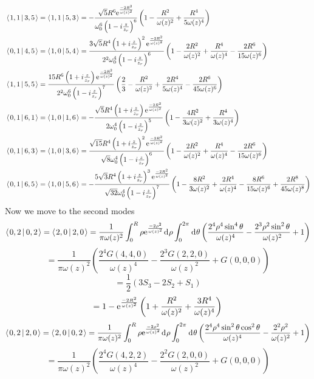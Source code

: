 \documentclass[11pt]{amsart}
\makeatletter
\newcommand{\e}{{\rm e}}				%
\newcommand{\msp}[1]{\mspace{#1mu}}		%
\newcommand{\0}{\varnothing}		%
\newcommand{\dd}{\msp{1} {\rm{d}} \msp{1}}	%
\newcommand{\brac}[2]{\left\langle\msp{2} #1\left\lvert \msp{3.5} #2 \right.\right\rangle}	%
\newcommand{\1}{!}
\newcommand{\2}{@}
\newcommand{\3}{\#}
\newcommand{\4}{\$}
\newcommand{\5}{\%}
\newcommand{\6}{$^\wedge$}
\newcommand{\7}{\&}
\newcommand{\8}{*}
\newcommand{\9}{(}
\makeatother
\begin{document}
\begin{align*}
&
\brac{1,1}{3,5} = \brac{1,1}{5,3} = -\frac{\sqrt{5}R^6\e^{\frac{-2R^2}{\omega(z)^2}}}{\omega_0^6\left(1-i\frac{z}{z_r}\right)^6}\left(1-\frac{R^2}{\omega(z)^2}+\frac{R^4}{5\omega(z)^4}\right)
\\
&
\brac{0,1}{4,5} = \brac{1,0}{5,4} = \frac{3\sqrt{5}R^4\left(1+i\frac{z}{z_r}\right)^2\e^{\frac{-2R^2}{\omega(z)^2}}}{2^2\omega_0^4\left(1-i\frac{z}{z_r}\right)^6}\left(1-\frac{2R^2}{\omega(z)^2}+\frac{R^4}{\omega(z)^4}-\frac{2R^6}{15\omega(z)^6}\right)
\\
&
\brac{1,1}{5,5} = \frac{15R^6\left(1+i\frac{z}{z_r}\right)\e^{\frac{-2R^2}{\omega(z)^2}}}{2^2\omega_0^6\left(1-i\frac{z}{z_r}\right)^7}\left(\frac{2}{3}-\frac{R^2}{\omega(z)^2}+\frac{2R^4}{5\omega(z)^4}-\frac{2R^6}{45\omega(z)^6}\right)
\\
&
\brac{0,1}{6,1} =\brac{1,0}{1,6} = -\frac{\sqrt{5}R^4\left(1+i\frac{z}{z_r}\right)\e^{\frac{-2R^2}{\omega(z)^2}}}{2\omega_0^4\left(1-i\frac{z}{z_r}\right)^5}\left(1-\frac{4R^2}{3\omega(z)^2}+\frac{R^4}{3\omega(z)^4}\right)
\\
&
\brac{0,1}{6,3} = \brac{1,0}{3,6} = \frac{\sqrt{15}R^4\left(1+i\frac{z}{z_r}\right)^2\e^{\frac{-2R^2}{\omega(z)^2}}}{\sqrt{8}\omega_0^4\left(1-i\frac{z}{z_r}\right)^6}\left(1-\frac{2R^2}{\omega(z)^2}+\frac{R^4}{\omega(z)^4}-\frac{2R^6}{15\omega(z)^6}\right)
\\
&
\brac{0,1}{6,5} = \brac{1,0}{5,6} = -\frac{5\sqrt{3}R^4\left(1+i\frac{z}{z_r}\right)^3\e^{\frac{-2R^2}{\omega(z)^2}}}{\sqrt{32}\omega_0^4\left(1-i\frac{z}{z_r}\right)^7}\left(1-\frac{8R^2}{3\omega(z)^2}+\frac{2R^4}{\omega(z)^4}-\frac{8R^6}{15\omega(z)^6}+\frac{2R^8}{45\omega(z)^8}\right)
\end{align*}
Now we move to the second modes
\[
\brac{0,2}{0,2} = \brac{2,0}{2,0} = \frac{1}{\pi \omega(z)^2}\int_0^R \rho \e^{\frac{-2\rho^2}{\omega(z)^2}}\dd \rho \int_0^{2\pi} \dd \theta \left(\frac{2^4\rho^4\sin^4\theta}{\omega(z)^4}-\frac{2^3\rho^2\sin^2\theta}{\omega(z)^2}+1\right)
\]
\[
=\frac{1}{\pi\omega(z)^2}\left(\frac{2^4G(4,4,0)}{\omega(z)^4}-\frac{2^3G(2,2,0)}{\omega(z)^2}+G(0,0,0)\right)
\]
\[
=\frac{1}{2}\left(3S_3-2S_2+S_1\right)
\]
\[
=1-\e^{\frac{-2R^2}{\omega(z)^2}}\left(1+\frac{R^2}{\omega(z)^2}+\frac{3R^4}{\omega(z)^4}\right)
\]
\[
\brac{0,2}{2,0}= \brac{2,0}{0,2} = \frac{1}{\pi \omega(z)^2}\int_0^R\rho\e^{\frac{-2\rho^2}{\omega(z)^2}}\dd \rho \int_0^{2\pi}\dd\theta \left(\frac{2^4\rho^4\sin^2\theta\cos^2\theta}{\omega(z)^4}-\frac{2^2\rho^2}{\omega(z)^2}+1\right)
\]
\[
=\frac{1}{\pi\omega(z)^2}\left(\frac{2^4G(4,2,2)}{\omega(z)^4}-\frac{2^2G(2,0,0)}{\omega(z)^2}+G(0,0,0)\right)
\]
\end{document}
